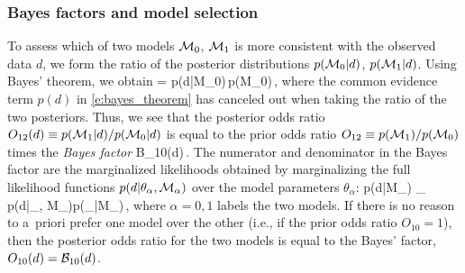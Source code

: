 \subsubsection{Bayes factors and model selection}
\label{s:bayes_factors}

To assess which of two models 
${\cal M}_0$, ${\cal M}_1$ is more consistent with
the observed data $d$, we form 
the ratio of the posterior distributions 
$p({\cal M}_0|d)$, $p({\cal M}_1|d)$.
Using Bayes' theorem, we obtain
\be
{} =
{p(d|{\cal M}_0)\,p({\cal M}_0)}\,,
\ee
%
where the common evidence term $p(d)$ in
\eqref{e:bayes_theorem} has canceled out 
when taking the ratio of the two posteriors.
Thus, we see that the posterior odds ratio
$O_{12}(d)\equiv p({\cal M}_1|d)/p({\cal M}_0|d)$
is equal to the prior odds ratio
$O_{12}\equiv p({\cal M}_1)/p({\cal M}_0)$
times the {\em Bayes factor}
%
\be
{\cal B}_{10}(d)\equiv {}\,.
\label{e:bayes_factor}
\ee
%
The numerator and denominator in the Bayes factor 
are the marginalized likelihoods obtained by 
marginalizing the full likelihood functions
$p(d|\theta_\alpha,{\cal M}_\alpha)$ over the 
model parameters $\theta_\alpha$:
%
\be
p(d|{\cal M}_\alpha) \equiv
{}\theta_\alpha\>
p(d|\theta_\alpha, {\cal M}_\alpha)p(\theta_\alpha|{\cal M}_\alpha)\,,
\ee
%
where $\alpha=0,1$ labels the two models.
If there is no reason to a~priori prefer one model over 
the other (i.e., if the prior odds ratio $O_{10}=1$), then the 
posterior odds ratio for the two models is equal to the 
Bayes' factor, $O_{10}(d) = {\cal B}_{10}(d)$.

